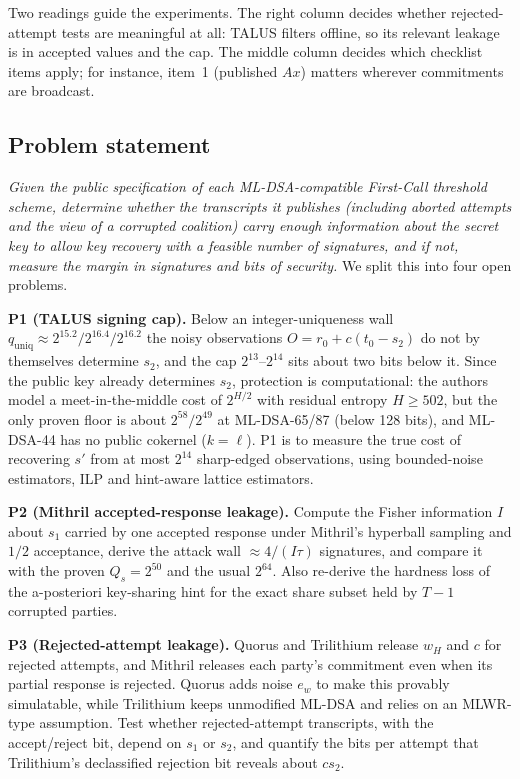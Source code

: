 \documentclass[10pt,conference,a4paper]{IEEEtran}
\begin{document}
Two readings guide the experiments. The right column decides whether rejected-attempt tests are meaningful at all:
TALUS filters offline, so its relevant leakage is in accepted values and the cap. The middle column decides which
checklist items apply; for instance, item~1 (published $Ax$) matters wherever commitments are broadcast.

\subsection{Problem statement}
\emph{Given the public specification of each ML-DSA-compatible First-Call threshold scheme, determine whether the
transcripts it publishes (including aborted attempts and the view of a corrupted coalition) carry enough information
about the secret key to allow key recovery with a feasible number of signatures, and if not, measure the margin in
signatures and bits of security.} We split this into four open problems.

\textbf{P1 (TALUS signing cap).} Below an integer-uniqueness wall $q_\mathrm{uniq}\approx2^{15.2}/2^{16.4}/2^{16.2}$ the
noisy observations $O=r_0+c(t_0-s_2)$ do not by themselves determine $s_2$, and the cap $2^{13}$--$2^{14}$ sits about two
bits below it. Since the public key already determines $s_2$, protection is computational: the authors model a
meet-in-the-middle cost of $2^{H/2}$ with residual entropy $H\ge502$, but the only proven floor is about $2^{58}/2^{49}$
at ML-DSA-65/87 (below 128 bits), and ML-DSA-44 has no public cokernel ($k=\ell$). P1 is to measure the true cost of
recovering $s'$ from at most $2^{14}$ sharp-edged observations, using bounded-noise estimators, ILP and hint-aware lattice
estimators.

\textbf{P2 (Mithril accepted-response leakage).} Compute the Fisher information $I$ about $s_1$ carried by one accepted
response under Mithril's hyperball sampling and $1/2$ acceptance, derive the attack wall $\approx4/(I\tau)$ signatures,
and compare it with the proven $Q_s=2^{50}$ and the usual $2^{64}$. Also re-derive the hardness loss of the
a-posteriori key-sharing hint for the exact share subset held by $T-1$ corrupted parties.

\textbf{P3 (Rejected-attempt leakage).} Quorus and Trilithium release $w_H$ and $c$ for rejected attempts, and Mithril
releases each party's commitment even when its partial response is rejected. Quorus adds noise $e_w$ to make this
provably simulatable, while Trilithium keeps unmodified ML-DSA and relies on an MLWR-type assumption. Test whether
rejected-attempt transcripts, with the accept/reject bit, depend on $s_1$ or $s_2$, and quantify the bits per attempt that
Trilithium's declassified rejection bit reveals about $cs_2$.
\end{document}
